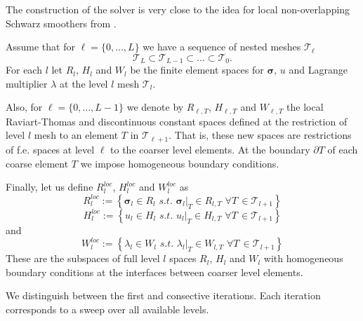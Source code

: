 \documentclass[a4paper,12pt]{amsart}
\numberwithin{equation}{section}
\newcommand{\T}{{\mathcal T}}
\def\bsigma{{\boldsymbol \sigma}}
\begin{document}
The construction of the solver is very close to the idea for local non-overlapping Schwarz smoothers from \cite{our_cfosls_paper}.

Assume that for $\ell=\{0, \dots, L\}$ we have a sequence of nested meshes $\mathcal{T}_{\ell}$
$$
\T_L \subset \T_{L-1} \subset \hdots \subset \T_0.
$$
For each $l$ let $R_{l}$, $H_l$ and $W_{l}$ be the finite element spaces for $\bsigma$, $u$ and Lagrange multiplier $\lambda$ at the level $l$ mesh $\mathcal{T}_l$. 

Also, for $\ell=\{0, \dots, L-1\}$ we denote by $R_{\ell,T}$, $H_{\ell,T}$ and $W_{\ell,T}$ the local Raviart-Thomas and discontinuous constant spaces defined at the restriction of level $l$ mesh to an element $T$ in $\mathcal{T}_{\ell + 1}$. That is, these new spaces are restrictions of f.e. spaces at level $\ell$ to the coarser level elements. At the boundary $\partial T$ of each coarse element $T$ we impose homogeneous boundary conditions.


Finally, let us define $R_{l}^{loc}$, $H_{l}^{loc}$ and $W_{l}^{loc}$ as
$$
R_{l}^{loc} := \left\{ \bsigma_l \in R_l \,\, s.t. \,\, \bsigma_l|_T \in R_{l,T} \, \, \forall T \, \in \T_{l+1} \right\}
$$
$$
H_{l}^{loc} := \left\{ u_l \in H_l \,\, s.t. \,\, u_l|_T \in H_{l,T} \, \, \forall T \, \in \T_{l+1} \right\}
$$
and
$$
W_{l}^{loc} := \left\{ \lambda_l \in W_l \,\, s.t. \,\, \lambda_l|_T \in W_{l,T} \, \, \forall T \, \in \T_{l+1} \right\}
$$
These are the subspaces of full level $l$ spaces $R_{l}$, $H_{l}$ and $W_{l}$ with homogeneous boundary conditions at the interfaces between coarser level elements. 

We distinguish between the first and consective iterations. Each iteration corresponds to a sweep over all available levels.
\end{document}
